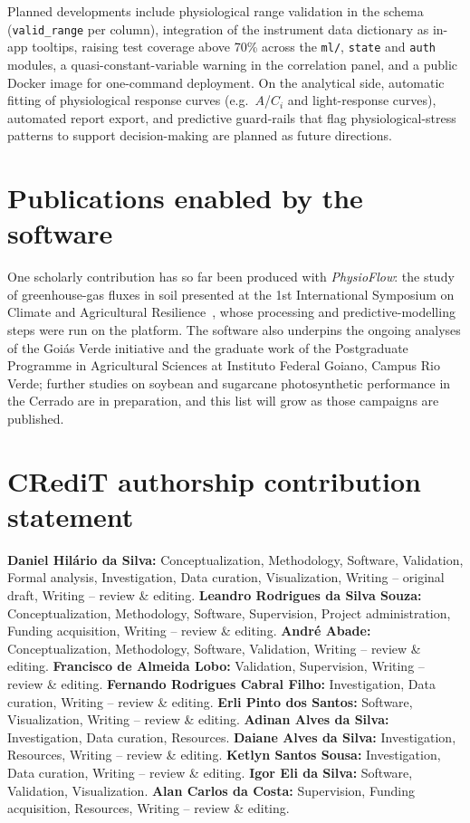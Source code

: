 \documentclass[11pt, letterpaper]{article}
\begin{document}
Planned developments include physiological range validation in the schema (\texttt{valid\_range} per column), integration of the instrument data dictionary as in-app tooltips, raising test coverage above 70\% across the \texttt{ml/}, \texttt{state} and \texttt{auth} modules, a quasi-constant-variable warning in the correlation panel, and a public Docker image for one-command deployment. On the analytical side, automatic fitting of physiological response curves (e.g.\ $A$/$C_i$ and light-response curves), automated report export, and predictive guard-rails that flag physiological-stress patterns to support decision-making are planned as future directions.

\section{Publications enabled by the software}\label{sec:enabled}

One scholarly contribution has so far been produced with \emph{PhysioFlow}: the study of greenhouse-gas fluxes in soil presented at the 1st International Symposium on Climate and Agricultural Resilience~\cite{DaSilva2026Goias}, whose processing and predictive-modelling steps were run on the platform. The software also underpins the ongoing analyses of the Goi\'as Verde initiative and the graduate work of the Postgraduate Programme in Agricultural Sciences at Instituto Federal Goiano, Campus Rio Verde; further studies on soybean and sugarcane photosynthetic performance in the Cerrado are in preparation, and this list will grow as those campaigns are published.

\section*{CRediT authorship contribution statement}
\textbf{Daniel Hil\'ario da Silva:} Conceptualization, Methodology, Software, Validation, Formal analysis, Investigation, Data curation, Visualization, Writing -- original draft, Writing -- review \& editing. \textbf{Leandro Rodrigues da Silva Souza:} Conceptualization, Methodology, Software, Supervision, Project administration, Funding acquisition, Writing -- review \& editing. \textbf{Andr\'e Abade:} Conceptualization, Methodology, Software, Validation, Writing -- review \& editing. \textbf{Francisco de Almeida Lobo:} Validation, Supervision, Writing -- review \& editing. \textbf{Fernando Rodrigues Cabral Filho:} Investigation, Data curation, Writing -- review \& editing. \textbf{Erli Pinto dos Santos:} Software, Visualization, Writing -- review \& editing. \textbf{Adinan Alves da Silva:} Investigation, Data curation, Resources. \textbf{Daiane Alves da Silva:} Investigation, Resources, Writing -- review \& editing. \textbf{Ketlyn Santos Sousa:} Investigation, Data curation, Writing -- review \& editing. \textbf{Igor Eli da Silva:} Software, Validation, Visualization. \textbf{Alan Carlos da Costa:} Supervision, Funding acquisition, Resources, Writing -- review \& editing.
\end{document}
